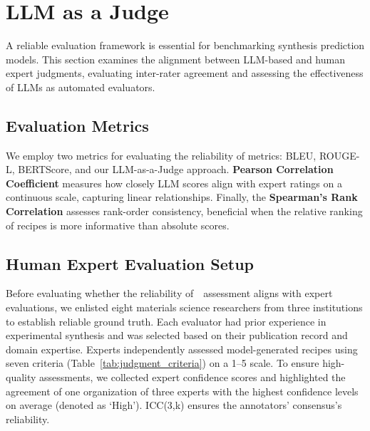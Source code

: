 

\section{LLM as a Judge}
\label{sec:reliability}

A reliable evaluation framework is essential for benchmarking synthesis prediction models. This section examines the alignment between LLM-based and human expert judgments, evaluating inter-rater agreement and assessing the effectiveness of LLMs as automated evaluators.

\subsection{Evaluation Metrics}
\label{subsec:evaluation_metrics}
We employ two metrics for evaluating the reliability of metrics: BLEU, ROUGE-L, BERTScore, and our LLM-as-a-Judge approach. \textbf{Pearson Correlation Coefficient} measures how closely LLM scores align with expert ratings on a continuous scale, capturing linear relationships. Finally, the \textbf{Spearman’s Rank Correlation} assesses rank-order consistency, beneficial when the relative ranking of recipes is more informative than absolute scores. 

\subsection{Human Expert Evaluation Setup}
\label{subsec:humaneval_setup}

Before evaluating whether the reliability of~\oursbench~assessment aligns with expert evaluations, we enlisted eight materials science researchers from three institutions to establish reliable ground truth. Each evaluator had prior experience in experimental synthesis and was selected based on their publication record and domain expertise. Experts independently assessed model-generated recipes using seven criteria (Table~\ref{tab:judgment_criteria}) on a 1–5 scale. To ensure high-quality assessments, we collected expert confidence scores and highlighted the agreement of one organization of three experts with the highest confidence levels on average (denoted as `High'). ICC(3,k) ensures the annotators' consensus's reliability. 

